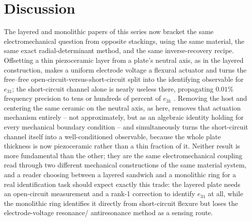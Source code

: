 \documentclass[11pt]{article}
\begin{document}
\section{Discussion}\label{sec:disc}
The layered and monolithic papers of this series now bracket the same
electromechanical question from opposite stackings, using the same
material, the same exact radial-determinant method, and the same
inverse-recovery recipe. Offsetting a thin piezoceramic layer from a
plate's neutral axis, as in the layered construction, makes a uniform
electrode voltage a flexural actuator and turns the free--free
open-circuit-versus-short-circuit split into the identifying observable
for $e_{31}$; the short-circuit channel alone is nearly useless there,
propagating $0.01\%$ frequency precision to tens or hundreds of percent
of $e_{31}$ \cite{mccune2026piezo}. Removing the host and centering the same
ceramic on the neutral axis, as here, removes that actuation mechanism
entirely -- not approximately, but as an algebraic identity holding for
every mechanical boundary condition -- and simultaneously turns the
short-circuit channel itself into a well-conditioned observable, because
the whole plate thickness is now piezoceramic rather than a thin
fraction of it. Neither result is more fundamental than the other; they
are the same electromechanical coupling read through two different
mechanical constructions of the same material system, and a reader
choosing between a layered sandwich and a monolithic ring for a real
identification task should expect exactly this trade: the layered plate
needs an open-circuit measurement and a rank-1 correction to identify
$e_{31}$ at all, while the monolithic ring identifies it directly from
short-circuit flexure but loses the electrode-voltage resonance/
antiresonance method as a sensing route.
\end{document}
